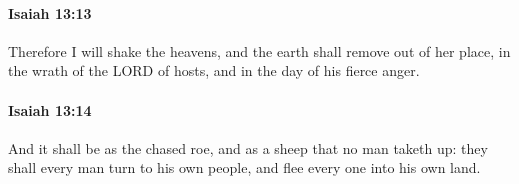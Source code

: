 		\paragraph{Isaiah 13:13} %
			\label{ISAIAH-13-13}

			Therefore I will shake the heavens, and the earth shall remove out of her place, in the wrath of the LORD of hosts, and in the day of his fierce anger.


		\paragraph{Isaiah 13:14} %
			\label{ISAIAH-13-14}

			And it shall be as the chased roe, and as a sheep that no man taketh up: they shall every man turn to his own people, and flee every one into his own land.


